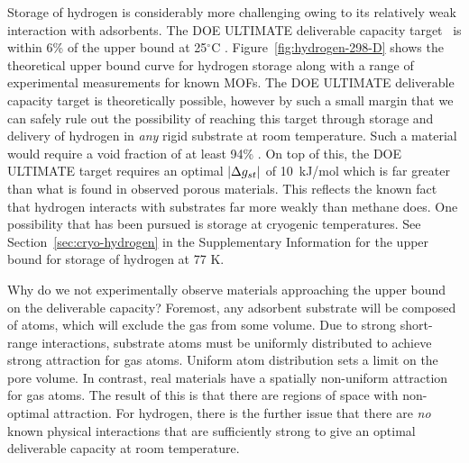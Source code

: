 Storage of hydrogen is considerably more challenging owing to its relatively weak interaction with adsorbents. The DOE ULTIMATE deliverable capacity target~\cite{DOE} is within 6\% of the upper bound at 25$^\circ$C . Figure~\ref{fig:hydrogen-298-D} shows the theoretical upper bound curve for hydrogen storage along with a range of experimental measurements for known MOFs.  The DOE ULTIMATE deliverable capacity target is theoretically possible, however by such a small margin that we can safely rule out the possibility of reaching this target through storage and delivery of hydrogen in \emph{any} rigid substrate at room temperature. Such a material would require a void fraction of at least 94\% . On top of this, the DOE ULTIMATE target requires an optimal $|\Delta g_{st}|$ of 10~kJ/mol which is far greater than what is found in observed porous materials. This reflects the known fact that hydrogen interacts with substrates far more weakly than methane does. One possibility that has been pursued is storage at cryogenic temperatures. See Section~\ref{sec:cryo-hydrogen} in the Supplementary Information for the upper bound for storage of hydrogen at 77 K.

Why do we not experimentally observe materials approaching the upper bound on the deliverable capacity? Foremost, any adsorbent substrate will be composed of atoms, which will exclude the gas from some volume. Due to strong short-range interactions, substrate atoms must be uniformly distributed to achieve strong attraction for gas atoms. Uniform atom distribution sets a limit on the pore volume.
In contrast, real materials have a spatially non-uniform attraction for gas atoms. The result of this is that there are regions of space with non-optimal attraction. For hydrogen, there is the further issue that there are \emph{no} known physical interactions that are sufficiently strong to give an optimal deliverable capacity at room temperature.

